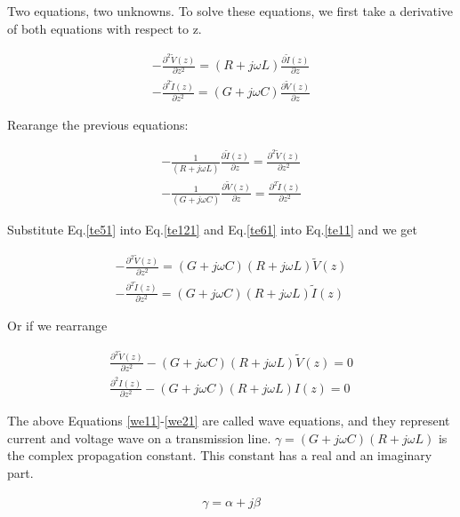 \documentclass{ximera}
\begin{document}
Two equations, two unknowns. To solve these equations, we first
take a derivative of both equations with respect to z. 

\begin{eqnarray}
-\frac{\partial^2 \tilde{V}(z)}{\partial z^2}=  (R+j\omega L) \frac{\partial
 \tilde{I}(z)}{\partial z}  \label{teleg3} \\
-\frac{\partial^2 \tilde{I}(z)}{\partial z^2}=  (G+j\omega C) \frac{\partial
 \tilde{V}(z)}{\partial z} \label{teleg4}
\end{eqnarray}

Rearange the previous equations:



\begin{eqnarray}
- \frac{1}{ (R+j\omega L)} \frac{\partial \tilde{I}(z)}{\partial z}= \frac{\partial^2
  \tilde{V}(z)}{\partial z^2} \label{te51} \\
-\frac{1}{ (G+j\omega C)} \frac{\partial \tilde{V}(z)}{\partial z}= \frac{\partial^2
  \tilde{I}(z)}{\partial z^2} \label{te61}
\end{eqnarray}

Substitute  Eq.\ref{te51} into  Eq.\ref{te121}
and Eq.\ref{te61} into Eq.\ref{te11} and we get

\begin{eqnarray}
-\frac{\partial^2 \tilde{V}(z)}{\partial z^2}=(G+j\omega C)(R+j\omega L) \tilde{V}(z) \label{teleg1} \\
-\frac{\partial^2 \tilde{I}(z)}{\partial z^2}= (G+j\omega C)  (R+j\omega L) \label{teleg2}
\tilde{I}(z) 
\end{eqnarray}

Or if we rearrange


\begin{eqnarray}
\frac{\partial^2 \tilde{V}(z)}{\partial z^2} -(G+j\omega C)(R+j\omega L)
 \tilde{V}(z)=0  \label{we11} \\ 
\frac{\partial^2 I(z)}{\partial z^2}- (G+j\omega C)  (R+j\omega L)
I(z)=0 \label{we21}
\end{eqnarray}

The above Equations \ref{we11}-\ref{we21} are called wave equations, and they represent
current and voltage wave on a transmission line. 
 $\gamma=(G+j\omega
C)(R+j\omega L)$ is the complex propagation constant. This constant
has a real and an imaginary part.

\begin{eqnarray}
\gamma= \alpha + j \beta \nonumber
\end{eqnarray}
\end{document}
